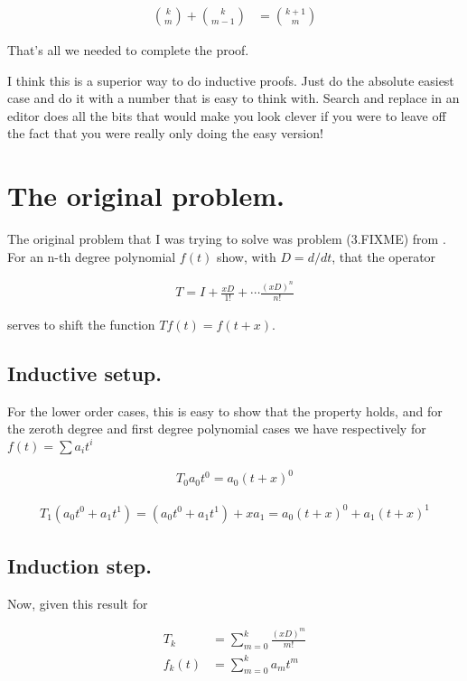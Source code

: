 \begin{align}
\binom{k}{m} + \binom{k}{m-1}
&=
\binom{k+1}{m}
\end{align}

That's all we needed to complete the proof.

I think this is a superior way to do inductive proofs.  Just do the absolute easiest case and do it with a number that is easy to think with.  Search and replace in an editor does all the bits that would make you look clever if you were to leave off the fact that you were really only doing the easy version!

\section{The original problem.}

The original problem that I was trying to solve was problem (3.FIXME) from \cite{byron1992mca}.  For an n-th degree polynomial $f(t)$
show, with $D = d/dt$, that the operator

\begin{align*}
T = I + \frac{xD}{1!} + \cdots \frac{(xD)^n}{n!}
\end{align*}

serves to shift the function $T f(t) = f(t + x)$.

\subsection{Inductive setup.}

For the lower order cases, this is easy to show that the property holds, and for the zeroth degree and first degree polynomial cases we have
respectively for $f(t) = \sum a_i t^i$

\begin{align*}
T_0 a_0 t^0 = a_0 (t + x)^0
\end{align*}

\begin{align*}
T_1 (a_0 t^0 + a_1 t^1) = (a_0 t^0 + a_1 t^1) + x a_1 = a_0(t + x)^0 + a_1(t + x)^1
\end{align*}

\subsection{Induction step.}

Now, given this result for 

\begin{align*}
T_k &= \sum_{m=0}^k \frac{(xD)^m}{m!} \\
f_k(t) &= \sum_{m=0}^k a_m t^m
\end{align*}

